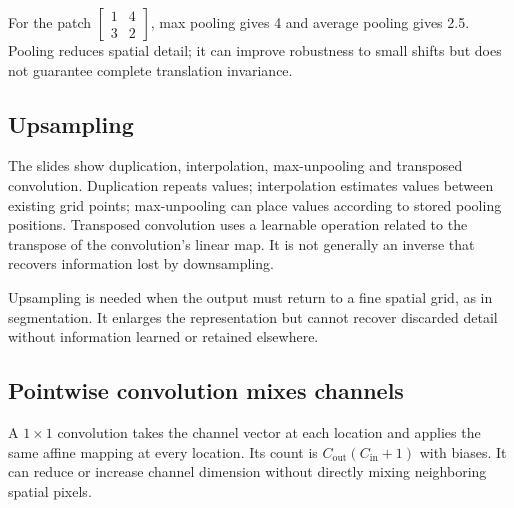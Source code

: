 \documentclass[11pt]{article}
\begin{document}
For the patch $\begin{bmatrix}1&4\\3&2\end{bmatrix}$, max pooling gives 4 and average pooling gives 2.5. Pooling reduces spatial detail; it can improve robustness to small shifts but does not guarantee complete translation invariance.
\subsection{Upsampling}
The slides show duplication, interpolation, max-unpooling and transposed convolution. Duplication repeats values; interpolation estimates values between existing grid points; max-unpooling can place values according to stored pooling positions. Transposed convolution uses a learnable operation related to the transpose of the convolution's linear map. It is not generally an inverse that recovers information lost by downsampling.

Upsampling is needed when the output must return to a fine spatial grid, as in segmentation. It enlarges the representation but cannot recover discarded detail without information learned or retained elsewhere.
\subsection{Pointwise convolution mixes channels}
A $1\times1$ convolution takes the channel vector at each location and applies the same affine mapping at every location. Its count is $C_{\mathrm{out}}(C_{\mathrm{in}}+1)$ with biases. It can reduce or increase channel dimension without directly mixing neighboring spatial pixels.
\end{document}
